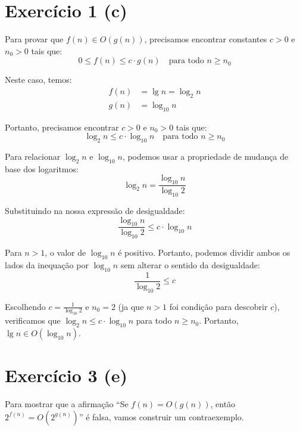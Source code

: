 \documentclass[a4paper,12pt]{article}
\begin{document}
\section*{Exercício 1 (c)}

Para provar que $f(n) \in O(g(n))$, precisamos encontrar constantes $c > 0$ e $n_0 > 0$ tais que:
\begin{equation}
0 \leq f(n) \leq c \cdot g(n) \quad \text{para todo } n \geq n_0
\end{equation}

Neste caso, temos:
\begin{align}
f(n) &= \lg n = \log_2 n \\
g(n) &= \log_{10} n
\end{align}

Portanto, precisamos encontrar $c > 0$ e $n_0 > 0$ tais que:
\begin{equation}
\log_2 n \leq c \cdot \log_{10} n \quad \text{para todo } n \geq n_0
\end{equation}

Para relacionar $\log_2 n$ e $\log_{10} n$, podemos usar a propriedade de mudança de base dos logaritmos:
\begin{equation}
\log_2 n = \frac{\log_{10} n}{\log_{10} 2}
\end{equation}

Substituindo na nossa expressão de desigualdade:
\begin{equation}
\frac{\log_{10} n}{\log_{10} 2} \leq c \cdot \log_{10} n
\end{equation}

Para $n > 1$, o valor de $\log_{10} n$ é positivo. Portanto, podemos dividir ambos os lados da inequação por $\log_{10} n$ sem alterar o sentido da desigualdade:
\begin{equation}
\frac{1}{\log_{10} 2} \leq c
\end{equation}

Escolhendo $c = \frac{1}{\log_{10} 2}$ e $n_0 = 2$ (ja que $n > 1$ foi condição para descobrir $c$), verificamos que $\log_2 n \leq c \cdot \log_{10} n$ para todo $n \geq n_0$. Portanto, $\lg n \in O(\log_{10} n)$.
\newpage
\section*{Exercício 3 (e)}

Para mostrar que a afirmação ``Se $f(n) = O(g(n))$, então $2^{f(n)} = O(2^{g(n)})$'' é falsa, vamos construir um contraexemplo.
\end{document}
